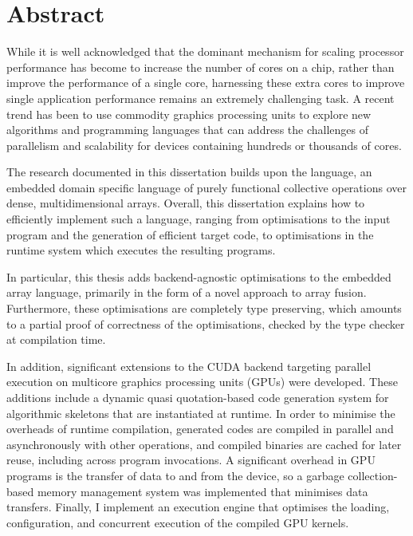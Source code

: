 
\chapter{Abstract}

While it is well acknowledged that the dominant mechanism for scaling processor
performance has become to increase the number of cores on a chip, rather than
improve the performance of a single core, harnessing these extra cores to
improve single application performance remains an extremely challenging task. A
recent trend has been to use commodity graphics processing units to explore new
algorithms and programming languages that can address the challenges of
parallelism and scalability for devices containing hundreds or thousands of
cores.

The research documented in this dissertation builds upon the 
language, an embedded domain specific language of purely functional collective
operations over dense, multidimensional arrays. Overall, this dissertation
explains how to efficiently implement such a language, ranging from
optimisations to the input program and the generation of efficient target code,
to optimisations in the runtime system which executes the resulting programs.

In particular, this thesis adds backend-agnostic optimisations to the embedded
array language, primarily in the form of a novel approach to array fusion.
Furthermore, these optimisations are completely type preserving, which amounts
to a partial proof of correctness of the optimisations, checked by the type
checker at compilation time.

In addition, significant extensions to the CUDA\cuda{} backend targeting parallel
execution on multicore graphics processing units (GPUs)\gpu{} were developed. These
additions include a dynamic quasi quotation-based code generation system for
algorithmic skeletons that are instantiated at runtime. In order to minimise the
overheads of runtime compilation, generated codes are compiled in parallel and
asynchronously with other operations, and compiled binaries are cached for later
reuse, including across program invocations. A significant overhead in GPU
programs is the transfer of data to and from the device, so a garbage
collection-based memory management system was implemented that minimises data
transfers. Finally, I implement an execution engine that optimises the loading,
configuration, and concurrent execution of the compiled GPU kernels.

